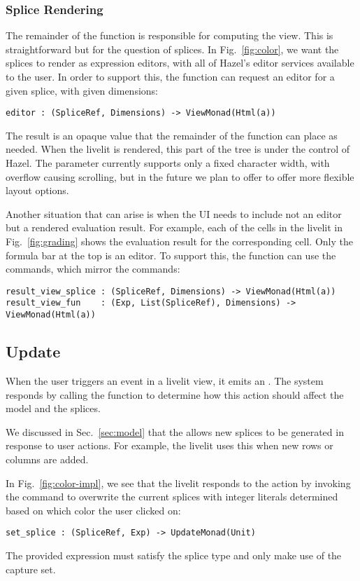 \subsubsection{Splice Rendering}
The remainder of the  function is responsible for computing the view.
This is straightforward but for the question of splices. In Fig.~\ref{fig:color},
we want the splices to render as expression editors, with all of Hazel's editor 
services available to the user. In order to support this, the  function
can request an editor for a given splice, with given dimensions:
\begin{lstlisting}[numbers=none]
editor : (SpliceRef, Dimensions) -> ViewMonad(Html(a))
\end{lstlisting}
The result is an opaque  value that the remainder of the function 
can place as needed. When the livelit is rendered, this part of the tree is 
under the control of Hazel. The  parameter currently supports only a fixed
character width, with overflow causing scrolling, but in the future we plan to offer 
to offer more flexible layout options.

Another situation that can arise is when the UI needs to include not an editor but 
a rendered evaluation result. For example, each of the cells in the 
livelit in Fig.~\ref{fig:grading} shows the evaluation result for the corresponding 
cell. Only the formula bar at the top is an editor. To support this, the 
function can use the  commands, which mirror the  commands:
\begin{lstlisting}[numbers=none]
result_view_splice : (SpliceRef, Dimensions) -> ViewMonad(Html(a))
result_view_fun    : (Exp, List(SpliceRef), Dimensions) -> ViewMonad(Html(a))
\end{lstlisting}


\subsection{Update}
When the user triggers an event in a livelit view, it emits an .
The system responds by calling the  function to determine how 
this action should affect the model and the splices. 

We discussed in Sec.~\ref{sec:model} that the 
allows new splices to be generated in response to user actions. 
For example, the  livelit uses this when new rows
or columns are added.

In Fig.~\ref{fig:color-impl}, we see that the  livelit responds to 
the  action by invoking the  command to overwrite 
the current splices with integer literals determined based on which color the user
clicked on:
\begin{lstlisting}[numbers=none]
  set_splice : (SpliceRef, Exp) -> UpdateMonad(Unit)
\end{lstlisting}
The provided expression must satisfy the splice type and only make use of the capture set.

